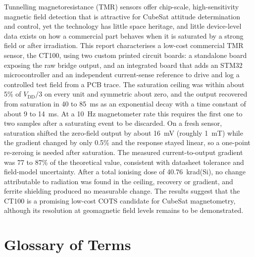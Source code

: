\documentclass[12pt,a4paper]{article}
\newcommand{\todo}[1]{\textcolor{red}{\textbf{[TODO: #1]}}}
\begin{document}
Tunnelling magnetoresistance (TMR) sensors offer chip-scale, high-sensitivity magnetic field detection that is attractive for CubeSat attitude determination and control, yet the technology has little space heritage, and little device-level data exists on how a commercial part behaves when it is saturated by a strong field or after irradiation. This report characterises a low-cost commercial TMR sensor, the CT100, using two custom printed circuit boards: a standalone board exposing the raw bridge output, and an integrated board that adds an STM32 microcontroller and an independent current-sense reference to drive and log a controlled test field from a PCB trace. The saturation ceiling was within about 5\% of $V_{\text{DD}}/3$ on every unit and symmetric about zero, and the output recovered from saturation in 40 to \SI{85}{\milli\second} as an exponential decay with a time constant of about 9 to \SI{14}{\milli\second}. At a \SI{10}{\hertz} magnetometer rate this requires the first one to two samples after a saturating event to be discarded. On a fresh sensor, saturation shifted the zero-field output by about \SI{16}{\milli\volt} (roughly \SI{1}{\milli\tesla}) while the gradient changed by only 0.5\% and the response stayed linear, so a one-point re-zeroing is needed after saturation. The measured current-to-output gradient was 77 to 87\% of the theoretical value, consistent with datasheet tolerance and field-model uncertainty. After a total ionising dose of \SI{40.76}{\kilo rad}(Si), no change attributable to radiation was found in the ceiling, recovery or gradient, and ferrite shielding produced no measurable change. The results suggest that the CT100 is a promising low-cost COTS candidate for CubeSat magnetometry, although its resolution at geomagnetic field levels remains to be demonstrated.

\clearpage

\tableofcontents
\clearpage

\setcounter{page}{1}
\section*{Glossary of Terms}
\end{document}
